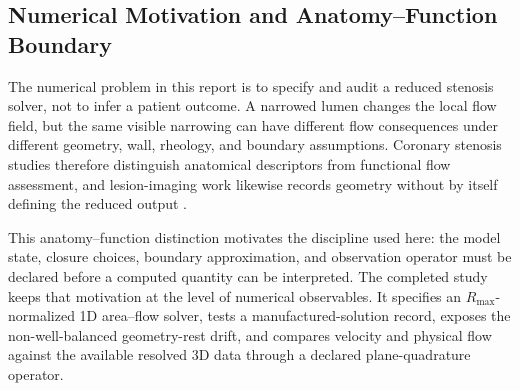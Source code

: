 \subsection{Numerical Motivation and Anatomy--Function Boundary}
\label{subsec:pressure-flow-motivation}

The numerical problem in this report is to specify and audit a reduced stenosis
solver, not to infer a patient outcome. A narrowed lumen changes the local flow
field, but the same visible narrowing can have different flow consequences under
different geometry, wall, rheology, and boundary assumptions. Coronary stenosis
studies therefore distinguish anatomical descriptors from functional flow
assessment, and lesion-imaging work likewise records geometry without by itself
defining the reduced output
\cite[p.~4401]{DerimayEtAl2021CoronaryStenosisObstruction}
\cite[Abstract; Methods]{VanDenHoogenEtAl2022CoronaryLesionCTA}.

This anatomy--function distinction motivates the discipline used here: the model
state, closure choices, boundary approximation, and observation operator must be
declared before a computed quantity can be interpreted. The completed study keeps
that motivation at the level of numerical observables. It specifies an
$R_{\max}$-normalized 1D area--flow solver, tests a manufactured-solution record,
exposes the non-well-balanced geometry-rest drift, and compares velocity and physical
flow against the available resolved 3D data through a declared plane-quadrature
operator.
